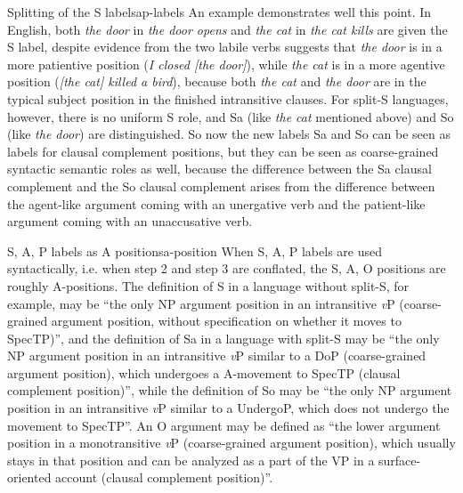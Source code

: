 \documentclass[UTF8, a4paper, oneside, scheme=plain]{ctexrep}
\newcommand{\corpus}[1]{\emph{#1}}
\newcommand{\vP}{\textit{v}P}
\begin{document}
\begin{infobox}{Splitting of the S label}{sap-labels}
    An example demonstrates well this point.
    In English, both \corpus{the door} in \corpus{the door opens}
    and \corpus{the cat} in \corpus{the cat kills} 
    are given the S label,
    despite evidence from the two labile verbs suggests that 
    \corpus{the door} is in a more patientive position (\corpus{I closed [the door]}), 
    while \corpus{the cat} is in a more agentive position (\corpus{[the cat] killed a bird}),
    because both \corpus{the cat} and \corpus{the door} are in the typical subject position 
    in the finished intransitive clauses.
    For split-S languages, however, there is no uniform S role,
    and Sa (like \corpus{the cat} mentioned above)
    and So (like \corpus{the door})
    are distinguished. 
    So now the new labels Sa and So can be seen as labels for clausal complement positions,
    but they can be seen as coarse-grained syntactic semantic roles as well,
    because the difference between the Sa clausal complement and the So clausal complement 
    arises from the difference between the agent-like argument coming with an unergative verb
    and the patient-like argument coming with an unaccusative verb.
\end{infobox}

\begin{theorybox}{S, A, P labels as A positions}{a-position}
    When S, A, P labels are used syntactically, i.e. when step 2 and step 3 are conflated,
    the S, A, O positions are roughly A-positions. 
    The definition of S in a language without split-S, for example, may be 
    ``the only NP argument position in an intransitive \vP{}
    (coarse-grained argument position, without specification on whether it moves to SpecTP)'',
    and the definition of Sa in a language with split-S may be 
    ``the only NP argument position in an intransitive \vP{} similar to a DoP (coarse-grained argument position),
    which undergoes a A-movement to SpecTP (clausal complement position)'',
    while the definition of So may be 
    ``the only NP argument position in an intransitive \vP{} similar to a UndergoP,
    which does not undergo the movement to SpecTP''.
    An O argument may be defined as ``the lower argument position in a monotransitive \vP{} 
    (coarse-grained argument position),
    which usually stays in that position and can be analyzed as a part of the VP in a surface-oriented account
    (clausal complement position)''.
\end{theorybox}
\end{document}
